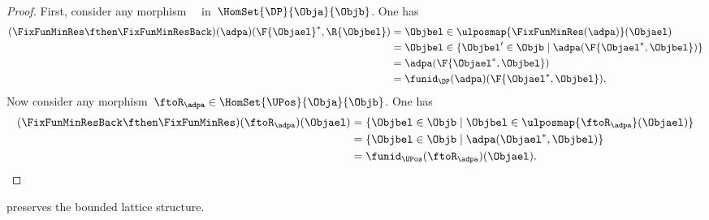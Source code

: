\begin{proof}
    First, consider any morphism~~ in~$\HomSet{\DP}{\Obja}{\Objb}$.
    One has
    \begin{equation*}
        \begin{aligned}
        (\FixFunMinRes \fthen \FixFunMinResBack)(\adpa)(\F{\Objael}^*,\R{\Objbel})
            &=
            \Objbel \in \ulposmap{\FixFunMinRes(\adpa)}(\Objael)\\
            &=\Objbel \in \{ \Objbel' \in \Objb \mid \adpa(\F{\Objael^*,\Objbel})\}\\
            &=\adpa(\F{\Objael^*,\Objbel})\\
            &=\funid_\DP(\adpa)(\F{\Objael^*,\Objbel}).
        \end{aligned}
    \end{equation*}
    Now consider any morphism~$\ftoR_\adpa \in \HomSet{\UPos}{\Obja}{\Objb}$.
    One has
    \begin{equation*}
        \begin{aligned}
        (\FixFunMinResBack \fthen \FixFunMinRes)(\ftoR_\adpa)(\Objael)
            &=
            \{ \Objbel \in \Objb\mid \Objbel \in \ulposmap{\ftoR_\adpa}(\Objael)\}\\
            &=\{ \Objbel \in \Objb\mid \adpa(\Objael^*,\Objbel)\}\\
            &=\funid_\UPos(\ftoR_\adpa)(\Objael).
        \end{aligned}
    \end{equation*}

\end{proof}
\begin{lemma}
    \FixFunMinRes preserves the bounded lattice structure.
\end{lemma}
